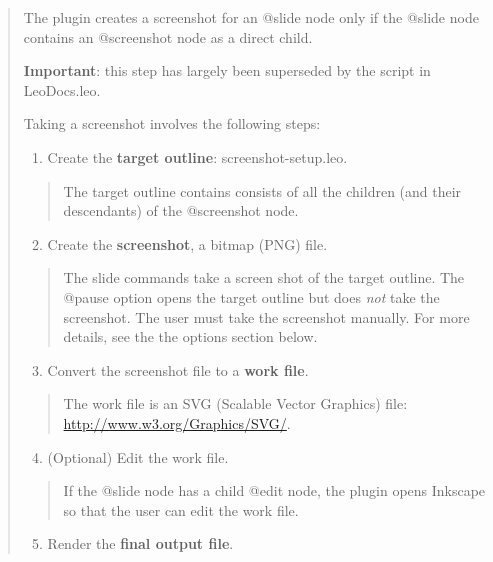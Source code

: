 \documentclass[a4paper,10pt,english]{sphinxmanual}
\begin{document}
\begin{quote}

The plugin creates a screenshot for an @slide
node only if the @slide node contains an
@screenshot node as a direct child.

\textbf{Important}: this step has largely been
superseded by the  script in
LeoDocs.leo.

Taking a screenshot involves the following steps:
\begin{enumerate}
\item {} 
Create the \textbf{target outline}: screenshot-setup.leo.

\end{enumerate}
\begin{quote}

The target outline contains consists of all
the children (and their descendants) of the
@screenshot node.
\end{quote}
\begin{enumerate}
\setcounter{enumi}{1}
\item {} 
Create the \textbf{screenshot}, a bitmap (PNG) file.

\end{enumerate}
\begin{quote}

The slide commands take a screen shot of the
target outline. The @pause option opens the
target outline but does \emph{not} take the
screenshot. The user must take the screenshot
manually. For more details, see the the
options section below.
\end{quote}
\begin{enumerate}
\setcounter{enumi}{2}
\item {} 
Convert the screenshot file to a \textbf{work file}.

\end{enumerate}
\begin{quote}

The work file is an SVG (Scalable Vector
Graphics) file: \href{http://www.w3.org/Graphics/SVG/}{http://www.w3.org/Graphics/SVG/}.
\end{quote}
\begin{enumerate}
\setcounter{enumi}{3}
\item {} 
(Optional) Edit the work file.

\end{enumerate}
\begin{quote}

If the @slide node has a child @edit node, the
plugin opens Inkscape so that the user can
edit the work file.
\end{quote}
\begin{enumerate}
\setcounter{enumi}{4}
\item {} 
Render the \textbf{final output file}.


\end{enumerate}
\end{quote}
\end{document}
